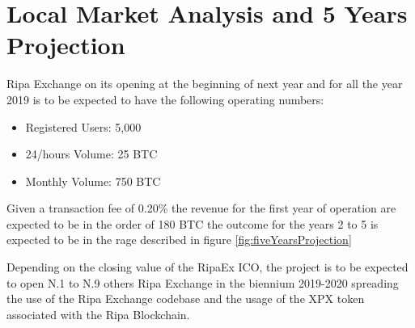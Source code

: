 \documentclass[11pt,fleqn,oneside]{book} %
\begin{document}
\section{Local Market Analysis and 5 Years Projection}
Ripa Exchange on its opening at the beginning of next year and for all the year 2019 is to be expected
to have the following operating numbers:
\begin{itemize}
	\item Registered Users: 5,000			%
	\item 24/hours Volume: 25 BTC			%
	\item Monthly Volume: 750 BTC			%
\end{itemize}

Given a transaction fee of 0.20\% the revenue for the first year of operation are expected to be in the order of 180 BTC the 
outcome for the years 2 to 5 is expected to be in the rage described in figure \ref{fig:fiveYearsProjection} 
\begin{center}
	\label{fig:fiveYearsProjection}
\end{center}

Depending on the closing value of the RipaEx ICO, the project is to be expected to open N.1 to N.9 others Ripa Exchange in 
the biennium 2019-2020 spreading the use of the Ripa Exchange codebase and the usage of the XPX token associated with the 
Ripa Blockchain.
\end{document}
